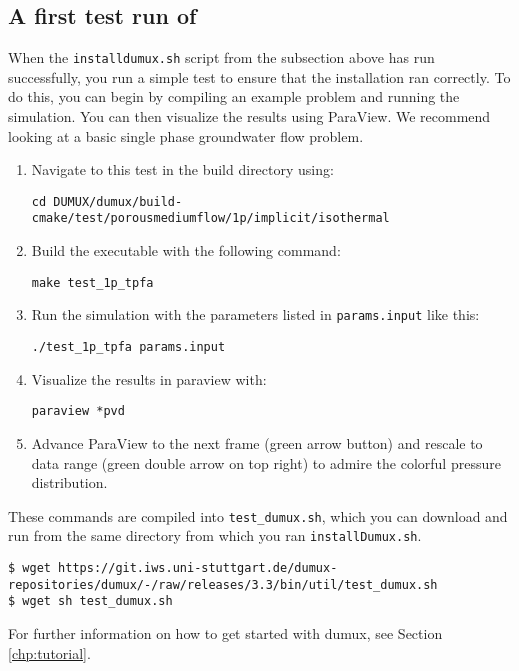 \subsection{A first test run of \Dumux}
When the \texttt{installdumux.sh} script from the subsection above has run successfully,
you run a simple test to ensure that the installation ran correctly. To do this, you can
begin by compiling an example problem and running the simulation. You can then visualize
the results using ParaView. We recommend looking at a basic single phase groundwater flow problem.
\begin{enumerate}
\item Navigate to this test in the build directory using:
\begin{lstlisting}[style=Bash]
cd DUMUX/dumux/build-cmake/test/porousmediumflow/1p/implicit/isothermal
\end{lstlisting}
\item Build the executable with the following command:
\begin{lstlisting}[style=Bash]
make test_1p_tpfa
\end{lstlisting}
\item Run the simulation with the parameters listed in \texttt{params.input} like this:
\begin{lstlisting}[style=Bash]
./test_1p_tpfa params.input
\end{lstlisting}
\item Visualize the results in paraview with:
\begin{lstlisting}[style=Bash]
paraview *pvd
\end{lstlisting}
\item Advance ParaView to the next frame (green arrow button) and rescale to data range
(green double arrow on top right) to admire the colorful pressure distribution.
\end{enumerate}

These commands are compiled into \texttt{test\_dumux.sh}, which you can download and run
from the same directory from which you ran \texttt{installDumux.sh}.

\begin{lstlisting}[style=Bash]
$ wget https://git.iws.uni-stuttgart.de/dumux-repositories/dumux/-/raw/releases/3.3/bin/util/test_dumux.sh
$ wget sh test_dumux.sh
\end{lstlisting}

For further information on how to get started with dumux, see Section \ref{chp:tutorial}.
